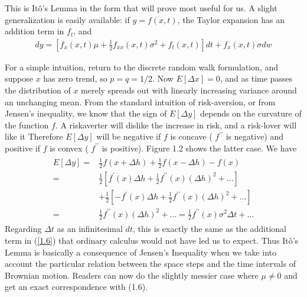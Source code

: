 \documentclass[12pt]{article}
\theoremstyle{definition}
\begin{document}
This is Itô's Lemma in the form that will prove most useful for us. A slight generalization is easily available: if $y=f(x, t)$, the Taylor expansion has an addition term in $f_{t}$, and
\begin{align}
d y=\left[f_{x}(x, t) \mu+\frac{1}{2} f_{x x}(x, t) \sigma^{2}+f_{t}(x, t)\right] d t+f_{x}(x, t) \sigma d w \label{1.7}
\end{align}

For a simple intuition, return to the discrete random walk formulation, and suppose $x$ has zero trend, so $p=q=1 / 2$. Now $E[\Delta x]=0$,
and as time passes the distribution of $x$ merely spreads out with linearly increasing variance around an unchanging mean. From the standard intuition of risk-aversion, or from Jensen's inequality, we know that the sign of $E[\Delta y]$ depends on the curvature of the function $f$. A riskaverter will dislike the increase in risk, and a risk-lover will like it Therefore $E[\Delta y]$ will be negative if $f$ is concave ( $f^{\prime \prime}$ is negative) and positive if $f$ is convex ( $f^{\prime \prime}$ is positive). Figure 1.2 shows the latter case. We have
\begin{align*}
\begin{aligned}
E[\Delta y]= & \frac{1}{2} f(x+\Delta h)+\frac{1}{2} f(x-\Delta h)-f(x) \\
= & \frac{1}{2}\left[f^{\prime}(x) \Delta h+\frac{1}{2} f^{\prime \prime}(x)(\Delta h)^{2}+\ldots\right] \\
& +\frac{1}{2}\left[-f^{\prime}(x) \Delta h+\frac{1}{2} f^{\prime \prime}(x)(\Delta h)^{2}+\ldots\right] \\
= & \frac{1}{2} f^{\prime \prime}(x)(\Delta h)^{2}+\ldots=\frac{1}{2} f^{\prime \prime}(x) \sigma^{2} \Delta t+\ldots
\end{aligned}
\end{align*}
Regarding $\Delta t$ as an infinitesimal $dt$, this is exactly the same as the additional term in (\ref{1.6}) that ordinary calculus would not have led us to expect. Thus Itô's Lemma is basically a consequence of Jensen's Inequality when we take into account the particular relation between the space steps and the time intervals of Brownian motion. Readers can now do the slightly messier case where $\mu \neq 0$ and get an exact correspondence with (1.6).
\end{document}

